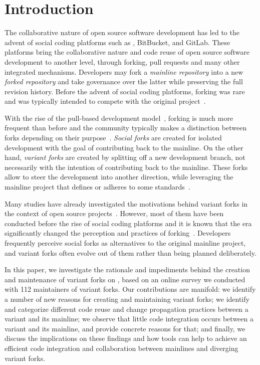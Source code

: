 \section{Introduction}
\label{sec:intro}

The collaborative nature of open source software development has led to the advent of social coding platforms such as \gh, BitBucket, and GitLab.
These platforms bring the collaborative nature and code reuse of open source software development to another level, through forking, pull requests and many other integrated mechanisms.
Developers may fork a \textit{mainline repository} into a new \textit{forked repository} and take governance over the latter while preserving the full revision history.
Before the advent of social coding platforms, forking was rare and was typically intended to compete with the original project~\cite{Linus:2012Perspectives,Gregorio:2012,Viseur:2012Forks,Linus:2013CodeForking,Linus:2011ToFork,Gamalielsson:2014Sustainability}.

With the rise of the pull-based development model~\cite{Gousios:2014ICSE}, forking is much more frequent than before and the community typically makes a distinction between forks depending on their purpose~\cite{Zhou:2020}.
\textit{Social forks} are created for isolated development with the goal of contributing back to the mainline.
On the other hand, \textit{variant forks} are created by splitting off a new development branch, not necessarily with the intention of contributing back to the mainline.
These forks allow to steer the development into another direction, while leveraging the mainline project that defines or adheres to some standards~\cite{sung:ICSE:2020}.

Many studies have already investigated the motivations behind variant forks in the context of open source projects~\cite{Linus:2012Perspectives,Gregorio:2012,Viseur:2012Forks,Linus:2013CodeForking,Linus:2011ToFork,Gamalielsson:2014Sustainability}.
However, most of them have been conducted before the rise of social coding platforms and it is known that the \gh era significantly changed the perception and practices of forking~\cite{Zhou:2020}.
Developers frequently perceive social forks as alternatives to the original mainline project, and variant forks often evolve out of them rather than being planned deliberately.

In this paper, we investigate the rationale and impediments behind the creation and maintenance of variant forks on \gh, based on an online survey we conducted with 112 maintainers of variant forks.
%
Our contributions are manifold:
we identify a number of new reasons for creating and maintaining variant forks;
we identify and categorize different code reuse and change propagation practices between a variant and its mainline;
we observe that little code integration occurs between a variant and its mainline, and provide concrete reasons for that;
and finally, we discuss the implications on these findings and how tools can help to achieve an efficient code integration and collaboration between mainlines and diverging variant forks.

